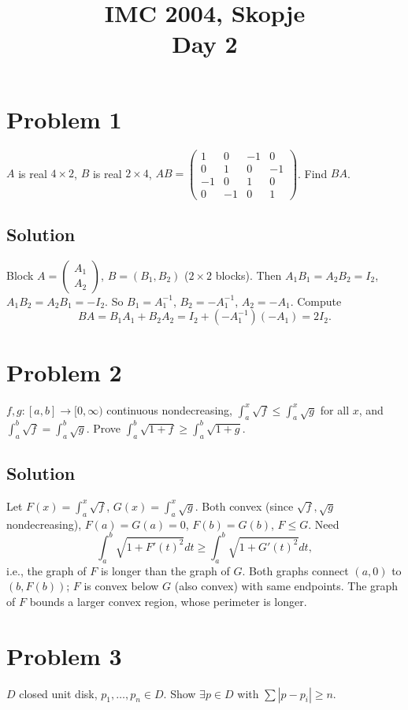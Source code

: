\documentclass{article}
\title{IMC 2004, Skopje \\ Day 2}
\date{}
\begin{document}
\maketitle

\section*{Problem 1}
$A$ is real $4 \times 2$, $B$ is real $2 \times 4$, $AB = \begin{pmatrix}1 & 0 & -1 & 0\\ 0 & 1 & 0 & -1\\ -1 & 0 & 1 & 0\\ 0 & -1 & 0 & 1\end{pmatrix}$. Find $BA$.

\subsection*{Solution}
Block $A = \begin{pmatrix}A_1\\A_2\end{pmatrix}$, $B = (B_1, B_2)$ ($2 \times 2$ blocks). Then $A_1 B_1 = A_2 B_2 = I_2$, $A_1 B_2 = A_2 B_1 = -I_2$. So $B_1 = A_1^{-1}$, $B_2 = -A_1^{-1}$, $A_2 = -A_1$. Compute
\[
BA = B_1 A_1 + B_2 A_2 = I_2 + (-A_1^{-1})(-A_1) = 2 I_2.
\]

\section*{Problem 2}
$f, g : [a, b] \to [0, \infty)$ continuous nondecreasing, $\int_a^x \sqrt f \le \int_a^x \sqrt g$ for all $x$, and $\int_a^b \sqrt f = \int_a^b \sqrt g$. Prove $\int_a^b \sqrt{1 + f} \ge \int_a^b \sqrt{1 + g}$.

\subsection*{Solution}
Let $F(x) = \int_a^x \sqrt f$, $G(x) = \int_a^x \sqrt g$. Both convex (since $\sqrt f, \sqrt g$ nondecreasing), $F(a) = G(a) = 0$, $F(b) = G(b)$, $F \le G$. Need
\[
\int_a^b \sqrt{1 + F'(t)^2} dt \ge \int_a^b \sqrt{1 + G'(t)^2} dt,
\]
i.e., the graph of $F$ is longer than the graph of $G$. Both graphs connect $(a, 0)$ to $(b, F(b))$; $F$ is convex below $G$ (also convex) with same endpoints. The graph of $F$ bounds a larger convex region, whose perimeter is longer.

\section*{Problem 3}
$D$ closed unit disk, $p_1, \ldots, p_n \in D$. Show $\exists p \in D$ with $\sum |p - p_i| \ge n$.
\end{document}
